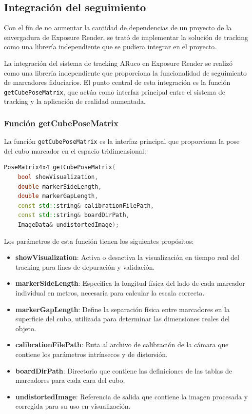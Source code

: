 \subsection{Integración del seguimiento}
Con el fin de no aumentar la cantidad de dependencias de un proyecto de la envergadura de Exposure Render, se trató de implementar la solución de tracking como una librería independiente que se pudiera integrar en el proyecto.

La integración del sistema de tracking ARuco en Exposure Render se realizó como una librería independiente que proporciona la funcionalidad de seguimiento de marcadores fiduciarios. El punto central de esta integración es la función \texttt{getCubePoseMatrix}, que actúa como interfaz principal entre el sistema de tracking y la aplicación de realidad aumentada.

\subsubsection{Función getCubePoseMatrix}
La función \texttt{getCubePoseMatrix} es la interfaz principal que proporciona la pose del cubo marcador en el espacio tridimensional:

\begin{lstlisting}[language=C++]
PoseMatrix4x4 getCubePoseMatrix(
    bool showVisualization,
    double markerSideLength,
    double markerGapLength,
    const std::string& calibrationFilePath,
    const std::string& boardDirPath,
    ImageData& undistortedImage);
\end{lstlisting}

Los parámetros de esta función tienen los siguientes propósitos:

\begin{itemize}
    \item \textbf{showVisualization}: Activa o desactiva la visualización en tiempo real del tracking para fines de depuración y validación.
    \item \textbf{markerSideLength}: Especifica la longitud física del lado de cada marcador individual en metros, necesaria para calcular la escala correcta.
    \item \textbf{markerGapLength}: Define la separación física entre marcadores en la superficie del cubo, utilizada para determinar las dimensiones reales del objeto.
    \item \textbf{calibrationFilePath}: Ruta al archivo de calibración de la cámara que contiene los parámetros intrínsecos y de distorsión.
    \item \textbf{boardDirPath}: Directorio que contiene las definiciones de las tablas de marcadores para cada cara del cubo.
    \item \textbf{undistortedImage}: Referencia de salida que contiene la imagen procesada y corregida para su uso en visualización.
\end{itemize}

